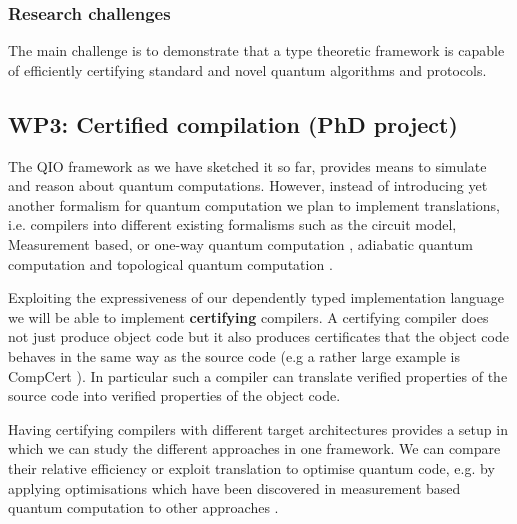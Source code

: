 \documentclass[a4paper]{article}
\begin{document}

\subsubsection*{Research challenges}

The main challenge is to demonstrate that a type theoretic framework
is capable of efficiently certifying standard and novel quantum
algorithms and protocols. 

\subsection*{WP3: Certified compilation (PhD project)}
\label{sec:wp3}

The QIO framework as we have sketched it so far, provides means to
simulate and reason about quantum computations. However, instead of
introducing yet another formalism for quantum computation we plan to
implement translations, i.e. compilers into different existing
formalisms such as the circuit model, Measurement based, or one-way
quantum computation ,
adiabatic quantum computation  and topological quantum
computation .

Exploiting the expressiveness of our dependently typed implementation
language we will be able to implement \textbf{certifying} compilers.
A certifying compiler does not just produce object code but it also
produces certificates that the object code behaves in the same way as
the source code (e.g a rather large example is CompCert
). In particular such a compiler can translate verified
properties of the source code into verified properties of the object
code. 

Having certifying compilers with different target architectures
provides a setup in which we can study the different approaches in one
framework. We can compare their relative efficiency or exploit
translation to optimise quantum code, e.g. by applying optimisations
which have been discovered in measurement based quantum computation to
other approaches .
\end{document}
